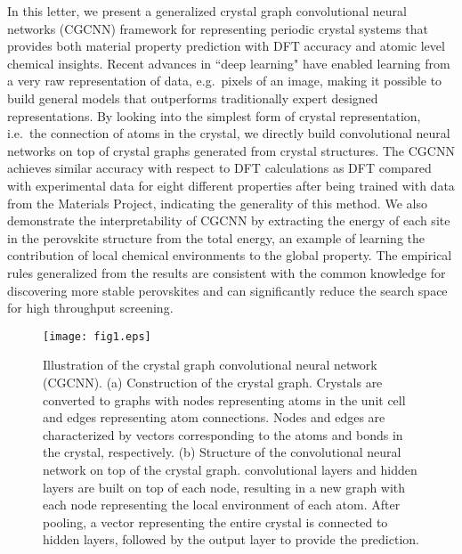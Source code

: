 \documentclass[twocolumn, prl]{revtex4-1}
\begin{document}
In this letter, we present a generalized crystal graph convolutional neural networks (CGCNN) framework for representing periodic crystal systems that provides both material property prediction with DFT accuracy and atomic level chemical insights. Recent advances in ``deep learning" have enabled learning from a very raw representation of data, e.g.\ pixels of an image, making it possible to build general models that outperforms traditionally expert designed representations\cite{lecun2015deep}. By looking into the simplest form of crystal representation, i.e.\ the connection of atoms in the crystal, we directly build convolutional neural networks on top of crystal graphs generated from crystal structures. The CGCNN achieves similar accuracy with respect to DFT calculations as DFT compared with experimental data for eight different properties after being trained with data from the Materials Project\cite{jain2013commentary}, indicating the generality of this method. We also demonstrate the interpretability of CGCNN by extracting the energy of each site in the perovskite structure from the total energy, an example of learning the contribution of local chemical environments to the global property. The empirical rules generalized from the results are consistent with the common knowledge for discovering more stable perovskites and can significantly reduce the search space for high throughput screening.

\begin{figure}[b]
  \centering
  \texttt{[image: fig1.eps]}
  \caption{Illustration of the crystal graph convolutional neural network (CGCNN). (a) Construction of the crystal graph. Crystals are converted to graphs with nodes representing atoms in the unit cell and edges representing atom connections. Nodes and edges are characterized by vectors corresponding to the atoms and bonds in the crystal, respectively. (b) Structure of the convolutional neural network on top of the crystal graph.  convolutional layers and  hidden layers are built on top of each node, resulting in a new graph with each node representing the local environment of each atom. After pooling, a vector representing the entire crystal is connected to  hidden layers, followed by the output layer to provide the prediction. }
  \label{fig:illustration}
\end{figure}
\end{document}
